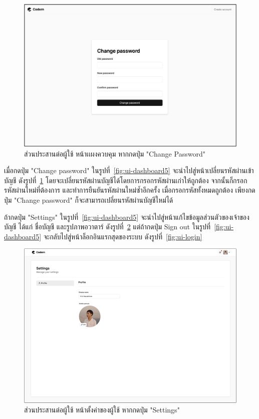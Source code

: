 \documentclass[12pt,one side,openright,a4paper]{cpe-thesis-th}
\newcommand{\thaijustify}[1]{%
  \par\hspace{30pt}\justifying
  #1
}
\begin{document}
\hypertarget{ui-settings-password}{
  \begin{figure}[H]
    \centering
    \includegraphics[width=15cm]{figure/ui/ui-settings-password.png}
    \caption[ส่วนประสานต่อผู้ใช้ หน้าตั้งค่าของผู้ใช้ (กดปุ่ม "Change Password")]{ ส่วนประสานต่อผู้ใช้ หน้าเเผงควบคุม หากกดปุ่ม "Change Password"}
    \label{fig:ui-settings-password}
  \end{figure}
}
\thaijustify{
  เมื่อกดปุ่ม "Change password" ในรูปที่~\ref{fig:ui-dashboard5} จะนำไปสู่หน้าเปลี่ยนรหัสผ่านเข้าบัญชี ดังรูปที่~\ref{fig:ui-settings-password} โดยจะเปลี่ยนรหัสผ่านบัญชีได้โดยการกรอกรหัสผ่านเก่าให้ถูกต้อง จากนั้นก็กรอกรหัสผ่านใหม่ที่ต้องการ และทำการยืนยันรหัสผ่านใหม่ซ้ำอีกครั้ง เมื่อกรอกรหัสทั้งหมดถูกต้อง เพียงกดปุ่ม "Change password" ก็จะสามารถเปลี่ยนรหัสผ่านบัญชีใหม่ได้
}
\thaijustify{
  ถ้ากดปุ่ม "Settings" ในรูปที่~\ref{fig:ui-dashboard5} จะนำไปสู่หน้าแก้ไขข้อมูลส่วนตัวของเจ้าของบัญชี ได้แก่ ชื่อบัญชี และรูปภาพอวาตาร์ ดังรูปที่~\ref{fig:ui-settings} แต่ถ้ากดปุ่ม Sign out ในรูปที่~\ref{fig:ui-dashboard5} จะกลับไปสู่หน้าล็อกอินแรกสุดของระบบ ดังรูปที่~\ref{fig:ui-login}
}
\hypertarget{ui-settings}{
  \begin{figure}[H]
    \centering
    \includegraphics[width=15cm]{figure/ui/ui-settings.png}
    \caption[ส่วนประสานต่อผู้ใช้ หน้าตั้งค่าของผู้ใช้ (กดปุ่ม "Settings")]{ส่วนประสานต่อผู้ใช้ หน้าตั้งค่าของผู้ใช้ หากกดปุ่ม "Settings"}
    \label{fig:ui-settings}
  \end{figure}
}
\end{document}
